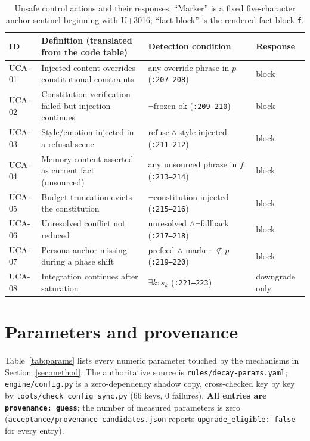 \begin{table}[t]
\centering\small
\caption{Unsafe control actions and their responses. ``Marker'' is a fixed
five-character anchor sentinel beginning with U+3016; ``fact block'' is the
rendered fact block \texttt{f}.}\label{tab:uca}
\begin{tabular}{@{}p{}p{}p{}p{}@{}}
\toprule
ID & Definition (translated from the code table) & Detection condition & Response \\
\midrule
UCA-01 & Injected content overrides constitutional constraints & any override phrase in $p$ (\texttt{:207--208}) & block \\
UCA-02 & Constitution verification failed but injection continues & $\neg\mathrm{frozen\_ok}$ (\texttt{:209--210}) & block \\
UCA-03 & Style/emotion injected in a refusal scene & $\mathrm{refuse} \land \mathrm{style\_injected}$ (\texttt{:211--212}) & block \\
UCA-04 & Memory content asserted as current fact (unsourced) & any unsourced phrase in $f$ (\texttt{:213--214}) & block \\
UCA-05 & Budget truncation evicts the constitution & $\neg\mathrm{constitution\_injected}$ (\texttt{:215--216}) & block \\
UCA-06 & Unresolved conflict not reduced & unresolved $\land \neg$fallback (\texttt{:217--218}) & block \\
UCA-07 & Persona anchor missing during a phase shift & prefeed $\land$ marker $\not\subseteq p$ (\texttt{:219--220}) & block \\
UCA-08 & Integration continues after saturation & $\exists k: s_k$ (\texttt{:221--223}) & downgrade only \\
\bottomrule
\end{tabular}
\end{table}

\section{Parameters and provenance}\label{sec:app:params}

Table~\ref{tab:params} lists every numeric parameter touched by the mechanisms
in Section~\ref{sec:method}. The authoritative source is
\texttt{rules/\allowbreak{}decay-\allowbreak{}params.\allowbreak{}yaml}; \texttt{engine/config.py} is a zero-dependency
shadow copy, cross-checked key by key by \texttt{tools/\allowbreak{}check\_\allowbreak{}config\_\allowbreak{}sync.\allowbreak{}py}
(66 keys, 0 failures). \textbf{All entries are \texttt{provenance: guess}}; the
number of measured parameters is zero
(\texttt{acceptance/\allowbreak{}provenance-\allowbreak{}candidates.\allowbreak{}json} reports
\texttt{upgrade\_\allowbreak{}eligible:\allowbreak{} false} for every entry).

